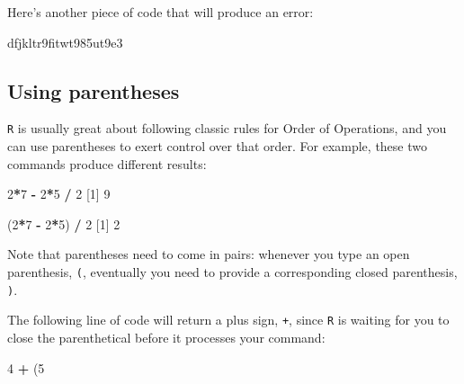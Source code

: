 \documentclass[
]{book}
\newenvironment{Shaded}{\begin{snugshade}}{\end{snugshade}}
\newcommand{\DecValTok}[1]{\textcolor[rgb]{0.00,0.00,0.81}{#1}}
\newcommand{\NormalTok}[1]{#1}
\newcommand{\OperatorTok}[1]{\textcolor[rgb]{0.81,0.36,0.00}{\textbf{#1}}}
\newcommand{\StringTok}[1]{\textcolor[rgb]{0.31,0.60,0.02}{#1}}
\begin{document}
Here's another piece of code that will produce an error:

\begin{Shaded}
\begin{Highlighting}[]
\NormalTok{dfjkltr9fitwt985ut9e3}
\end{Highlighting}
\end{Shaded}

\hypertarget{using-parentheses}{%
\subsection*{Using parentheses}\label{using-parentheses}}

\texttt{R} is usually great about following classic rules for Order of Operations, and you can use parentheses to exert control over that order. For example, these two commands produce different results:

\begin{Shaded}
\begin{Highlighting}[]
\DecValTok{2}\OperatorTok{*}\DecValTok{7} \OperatorTok{-}\StringTok{ }\DecValTok{2}\OperatorTok{*}\DecValTok{5} \OperatorTok{/}\StringTok{ }\DecValTok{2}
\NormalTok{[}\DecValTok{1}\NormalTok{] }\DecValTok{9}
\end{Highlighting}
\end{Shaded}

\begin{Shaded}
\begin{Highlighting}[]
\NormalTok{(}\DecValTok{2}\OperatorTok{*}\DecValTok{7} \OperatorTok{-}\StringTok{ }\DecValTok{2}\OperatorTok{*}\DecValTok{5}\NormalTok{) }\OperatorTok{/}\StringTok{ }\DecValTok{2}
\NormalTok{[}\DecValTok{1}\NormalTok{] }\DecValTok{2}
\end{Highlighting}
\end{Shaded}

Note that parentheses need to come in pairs: whenever you type an open parenthesis, \texttt{(}, eventually you need to provide a corresponding closed parenthesis, \texttt{)}.

The following line of code will return a plus sign, \texttt{+}, since \texttt{R} is waiting for you to close the parenthetical before it processes your command:

\begin{Shaded}
\begin{Highlighting}[]
\DecValTok{4} \OperatorTok{+}\StringTok{ }\NormalTok{(}\DecValTok{5}
\end{Highlighting}
\end{Shaded}
\end{document}
